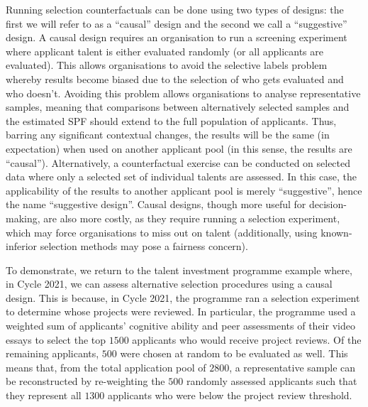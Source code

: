 Running selection counterfactuals can be done using two types of designs: the first we will refer to as a ``causal'' design and the second we call a ``suggestive'' design. A causal design requires an organisation to run a screening experiment where applicant talent is either evaluated randomly (or all applicants are evaluated). This allows organisations to avoid the selective labels problem whereby results become biased due to the selection of who gets evaluated and who doesn't. Avoiding this problem allows organisations to analyse representative samples, meaning that comparisons between alternatively selected samples and the estimated SPF should extend to the full population of applicants. Thus, barring any significant contextual changes, the results will be the same (in expectation) when used on another applicant pool (in this sense, the results are ``causal''). Alternatively, a counterfactual exercise can be conducted on selected data where only a selected set of individual talents are assessed. In this case, the applicability of the results to another applicant pool is merely ``suggestive'', hence the name ``suggestive design''. Causal designs, though more useful for decision-making, are also more costly, as they require running a selection experiment, which may force organisations to miss out on talent (additionally, using known-inferior selection methods may pose a fairness concern). 

To demonstrate, we return to the talent investment programme example where, in Cycle 2021, we can assess alternative selection procedures using a causal design. This is because, in Cycle 2021, the programme ran a selection experiment to determine whose projects were reviewed. In particular, the programme used a weighted sum of applicants' cognitive ability and peer assessments of their video essays to select the top $1500$ applicants who would receive project reviews. Of the remaining applicants, $500$ were chosen at random to be evaluated as well. This means that, from the total application pool of $2800$, a representative sample can be reconstructed by re-weighting the $500$ randomly assessed applicants such that they represent all $1300$ applicants who were below the project review threshold.

